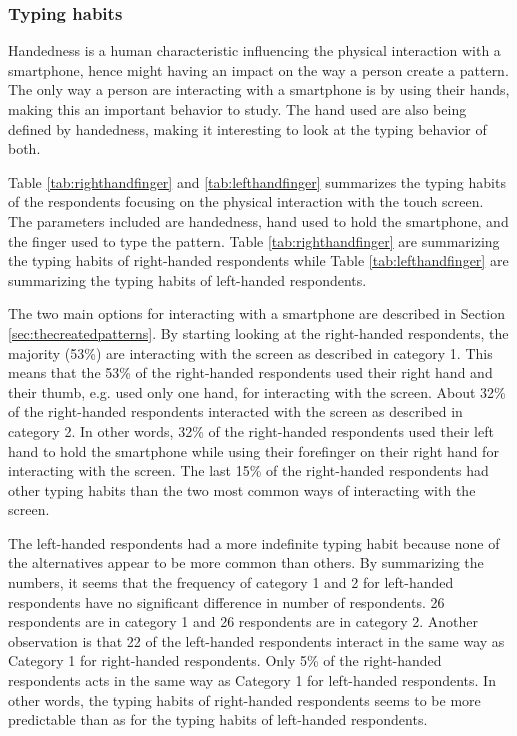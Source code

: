     \subsubsection{Typing habits}
    Handedness is a human characteristic influencing the physical interaction with a smartphone, hence might having an impact on the way a person create a pattern. The only way a person are interacting with a smartphone is by using their hands, making this an important behavior to study. The hand used are also being defined by handedness, making it interesting to look at the typing behavior of both. 

    Table \ref{tab:righthandfinger} and \ref{tab:lefthandfinger} summarizes the typing habits of the respondents focusing on the physical interaction with the touch screen. The parameters included are handedness, hand used to hold the smartphone, and the finger used to type the pattern. Table \ref{tab:righthandfinger} are summarizing the typing habits of right-handed respondents while Table \ref{tab:lefthandfinger} are summarizing the typing habits of left-handed respondents.

    The two main options for interacting with a smartphone are described in Section \ref{sec:thecreatedpatterns}. By starting looking at the right-handed respondents, the majority (53\%) are interacting with the screen as described in category 1. This means that the 53\% of the right-handed respondents used their right hand and their thumb, e.g. used only one hand, for interacting with the screen. About 32\% of the right-handed respondents interacted with the screen as described in category 2. In other words, 32\% of the right-handed respondents used their left hand to hold the smartphone while using their forefinger on their right hand for interacting with the screen. The last 15\% of the right-handed respondents had other typing habits than the two most common ways of interacting with the screen.

    The left-handed respondents had a more indefinite typing habit because none of the alternatives appear to be more common than others. By summarizing the numbers, it seems that the frequency of category 1 and 2 for left-handed respondents have no significant difference in number of respondents.  26 respondents are in category 1 and 26 respondents are in category 2. Another observation is that 22 of the left-handed respondents interact in the same way as Category 1 for right-handed respondents. Only 5\% of the right-handed respondents acts in the same way as Category 1 for left-handed respondents. In other words, the typing habits of right-handed respondents seems to be more predictable than as for the typing habits of left-handed respondents.

